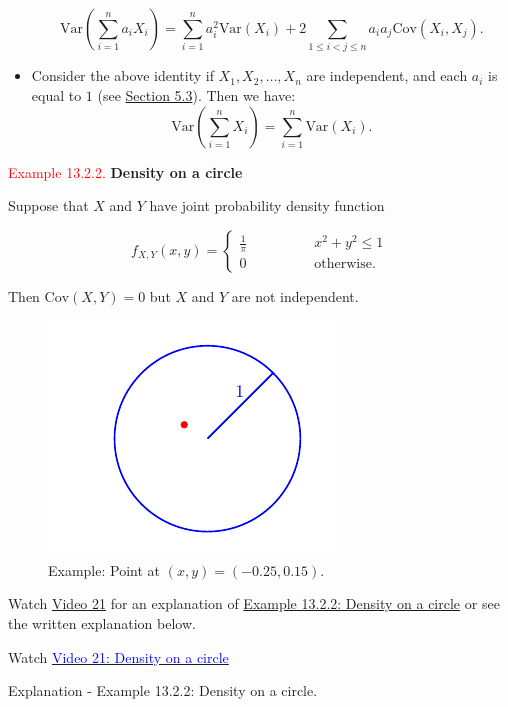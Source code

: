 \documentclass[
]{book}
\begin{document}
\begin{itemize}
  \[ \text{Var} \left( \sum_{i=1}^n a_iX_i \right) = \sum_{i=1}^n a_i^2 \text{Var}(X_i) + 2 \sum_{1 \leq i < j \leq n} a_ia_j\text{Cov}(X_i,X_j). \]
\item
  Consider the above identity if \(X_1,X_2,\dots,X_n\) are independent, and each \(a_i\) is equal to \(1\) (see \protect\hyperlink{rv:expect}{Section 5.3}). Then we have:\\

  \[\text{Var} \left( \sum_{i=1}^n X_i \right) = \sum_{i=1}^n \text{Var} (X_i).\]
\end{itemize}

\leavevmode{}%
\textcolor{red}{Example 13.2.2.}
{\textbf{Density on a circle} }

Suppose that \(X\) and \(Y\) have joint probability density function

\[f_{X,Y} (x,y) = \left\{ \begin{array}{ll} \frac{1}{\pi} \qquad \qquad & x^2 + y^2 \leq 1 \\ 0 & \mbox{otherwise}. \end{array} \right. \]

Then \(\text{Cov} (X,Y) =0\) but \(X\) and \(Y\) are not independent.

\begin{figure}
\includegraphics[width=0.5\linewidth]{Images/dart1} \caption{ Example: Point at $(x,y) =(-0.25,0.15)$.}\label{fig:circle1}
\end{figure}

Watch \protect\hyperlink{video21}{Video 21} for an explanation of \protect\hyperlink{Correlation:ex:circle}{Example 13.2.2: Density on a circle} or see the written explanation below.

Watch \href{https://mediaspace.nottingham.ac.uk/media/Density+on+a+Circle+FINAL+VERSION/1_l9dnkjmm}{\textcolor{blue}{Video 21: Density on a circle}}

Explanation - Example 13.2.2: Density on a circle.
\end{document}
